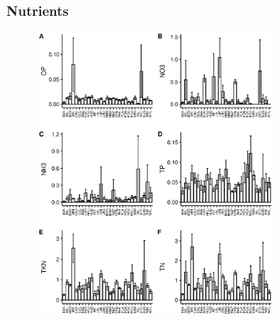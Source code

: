 \begin{frame}
	\frametitle{Nutrients}

	\begin{figure}	
		\includegraphics[width=0.7\textwidth, height=\textheight]{../figures/nutboxplotlake.eps}
	\end{figure}

\end{frame}

